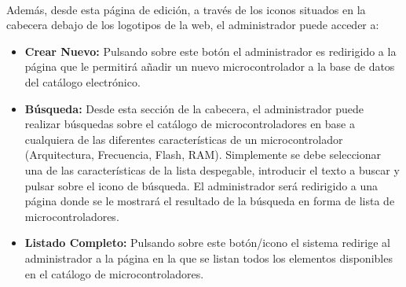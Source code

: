 \paragraph{}Además, desde esta página de edición, a través de los iconos situados en la cabecera debajo de los logotipos de la web, el administrador puede acceder a:

\begin{itemize}
	\item \textbf{Crear Nuevo:} Pulsando sobre este botón el administrador es redirigido a la página que le permitirá añadir un nuevo microcontrolador a la base de datos del catálogo electrónico.

	\item \textbf{Búsqueda:} Desde esta sección de la cabecera, el administrador puede realizar búsquedas sobre el catálogo de microcontroladores en base a cualquiera de las diferentes características de un microcontrolador (Arquitectura, Frecuencia, Flash, RAM). Simplemente se debe seleccionar una de las características de la lista despegable, introducir el texto a buscar y pulsar sobre el icono de búsqueda.
	El administrador será redirigido a una página donde se le mostrará el resultado de la búsqueda en forma de lista de microcontroladores.
			
	\item \textbf{Listado Completo:} Pulsando sobre este botón/icono el sistema redirige al administrador a la página en la que se listan todos los elementos disponibles en el catálogo de microcontroladores.
\end{itemize}